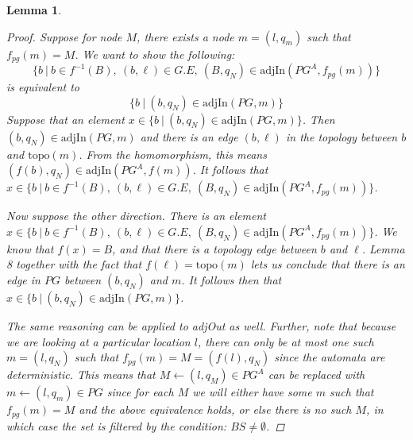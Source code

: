 \documentclass[twocolumn, openany]{sig-alternate-10pt}
\newcommand{\Topo}{\ensuremath{\mathrm{topo}}}
\newtheorem{lem}[thm]{Lemma}
\begin{document}
\begin{lem}
\begin{proof}
    Suppose for node $M$, there exists a node $m=(l,q_m)$ such that $f_{pg}(m) = M$. 
    We want to show the following:
    $$\{b ~\vert~ b \in f^{-1}(B),~ (b,\ell) \in G.E,~ (B,q_N) \in \mathrm{adjIn}(PG^A,f_{pg}(m)) \}$$
    is equivalent to
    $$\{ b ~\vert~ (b,q_N) \in \mathrm{adjIn}(PG,m)\}$$
    Suppose that an element $x \in \{ b ~\vert~ (b,q_N) \in \mathrm{adjIn}(PG,m)\}$. Then $(b,q_N) \in \mathrm{adjIn}(PG,m)$ and there is an edge $(b,\ell)$ in the topology between $b$ and $\Topo(m)$. From the homomorphism, this means $(f(b),q_N) \in \mathrm{adjIn}(PG^A,f(m))$. It follows that $x \in \{b ~\vert~ b \in f^{-1}(B),~ (b,\ell) \in G.E,~ (B,q_N) \in \mathrm{adjIn}(PG^A,f_{pg}(m)) \}$. 

    \vspace{1em}
    \noindent
    Now suppose the other direction. There is an element $x \in \{b ~\vert~ b \in f^{-1}(B),~ (b,\ell) \in G.E,~ (B,q_N) \in \mathrm{adjIn}(PG^A,f_{pg}(m)) \}$. We know that $f(x) = B$, and that there is a topology edge between $b$ and $\ell$. Lemma 8 together with the fact that $f(\ell) = \Topo(m)$ lets us conclude that there is an edge in $PG$ between $(b,q_N)$ and $m$. It follows then that $x \in \{ b ~\vert~ (b,q_N) \in \mathrm{adjIn}(PG,m)\}$.

    \vspace{1em}
    \noindent
    The same reasoning can be applied to adjOut as well. Further, note that because we are looking at a particular location $l$, there can only be at most one such $m = (l,q_N)$ such that $f_{pg}(m) = M = (f(l), q_N)$ since the automata are deterministic. 
    This means that $M \leftarrow (l,q_M) \in PG^A$ can be replaced with $m \leftarrow (l,q_m) \in PG$ since for each $M$ we will either have some $m$ such that $f_{pg}(m) = M$ and the above equivalence holds, or else there is no such $M$, in which case the set is filtered by the condition: $BS \neq \emptyset$.

  \end{proof}


\end{lem}
\end{document}
